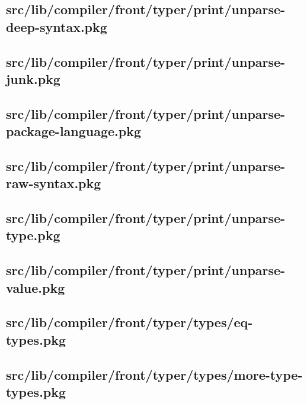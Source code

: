 \subsection{src/lib/compiler/front/typer/print/unparse-deep-syntax.pkg}


\subsection{src/lib/compiler/front/typer/print/unparse-junk.pkg}


\subsection{src/lib/compiler/front/typer/print/unparse-package-language.pkg}


\subsection{src/lib/compiler/front/typer/print/unparse-raw-syntax.pkg}


\subsection{src/lib/compiler/front/typer/print/unparse-type.pkg}


\subsection{src/lib/compiler/front/typer/print/unparse-value.pkg}


\subsection{src/lib/compiler/front/typer/types/eq-types.pkg}


\subsection{src/lib/compiler/front/typer/types/more-type-types.pkg}


